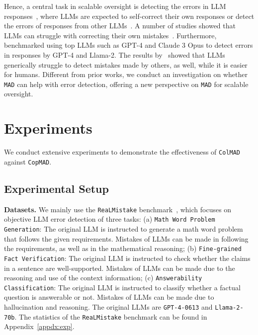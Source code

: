 \documentclass{article} %
\newcommand{\ours}[0]{\texttt{ColMAD}\xspace}
\newcommand{\copmad}[0]{\texttt{CopMAD}\xspace}
\newcommand{\mad}[0]{\texttt{MAD}\xspace}
\newcommand{\real}[0]{\texttt{ReaLMistake}\xspace}
\newcommand{\mathw}[0]{\texttt{Math Word Problem Generation}\xspace}
\newcommand{\fine}[0]{\texttt{Fine-grained Fact Verification}\xspace}
\newcommand{\answer}[0]{\texttt{Answerability Classification}\xspace}
\begin{document}
Hence, a central task in scalable oversight is detecting the errors in LLM responses~\citep{realmistake,tyen2024cannotfind,huang2024cannotselfcorrect,kamoi2024self-correction}, where LLMs are expected to self-correct their own responses or detect the errors of responses from other LLMs~\citep{kamoi2024self-correction}.
A number of studies showed that LLMs can struggle with correcting their own mistakes~\citep{tyen2024cannotfind,huang2024cannotselfcorrect}.
Furthermore, \citet{realmistake} benchmarked using top LLMs such as GPT-4 and Claude 3 Opus to detect errors in responses by GPT-4 and Llama-2. The results by~\citet{realmistake} showed that LLMs generically struggle to detect mistakes made by others, as well, while it is easier for humans.
%
Different from prior works, we conduct an investigation on whether \mad can help with error detection, offering a new perspective on \mad for scalable oversight.


\section{Experiments}
\label{sec:exp}
We conduct extensive experiments to demonstrate the effectiveness of \ours against \copmad.



\subsection{Experimental Setup}
\textbf{Datasets.} We mainly use the \real benchmark~\citep{realmistake}, which focuses on objective LLM error detection of three tasks:
(a) \mathw: The original LLM is instructed to generate a math word problem that follows the given requirements. Mistakes of LLMs can be made in following the requirements, as well as in the mathematical reasoning; (b) \fine: The original LLM is instructed to check whether the claims in a sentence are well-supported. Mistakes of LLMs can be made due to the reasoning and use of the context information; (c) \answer: The original LLM is instructed to classify whether a factual question is answerable or not. Mistakes of LLMs can be made due to hallucination and reasoning.
The original LLMs are \texttt{GPT-4-0613} and \texttt{Llama-2-70b}.
The statistics of the \real benchmark can be found in Appendix~\ref{appdx:exp}.
\end{document}
